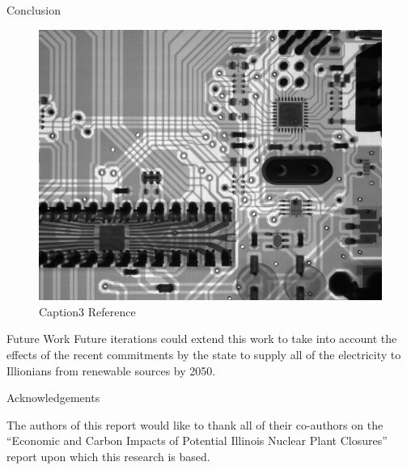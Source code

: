 \documentclass[final]{beamer}
\newlength{\onecolwid}
\newlength{\threecolwid}
\begin{document}
\begin{frame}[t]
\begin{columns}[t,totalwidth=\threecolwid]
\begin{column}{\onecolwid}
\begin{block}{Conclusion}
\begin{figure}
	\label{fig:figure_label_ex3}
	\includegraphics[width=0.9\linewidth]{graphic_name3}
	\caption{Caption3 Reference \cite{call_tag_article}}
\end{figure}

\end{block}

\begin{alertblock}{Future Work }
	Future iterations could extend this work to take into account the effects of the recent commitments by the state to supply all of the electricity to Illionians from renewable sources by 2050.

\end{alertblock}




\begin{block}{Acknowledgements}
	
	The authors of this report would like to thank all of their co-authors on the “Economic and Carbon Impacts of Potential Illinois Nuclear Plant Closures” report upon which this research is based.
	

\end{block}
\end{column}
\end{columns}
\end{frame}
\end{document}
